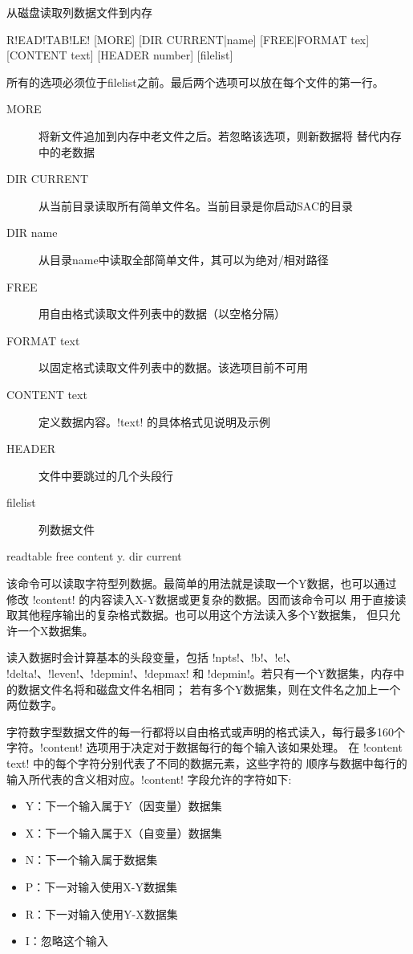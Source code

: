 \label{cmd:readtable}

从磁盘读取列数据文件到内存

\begin{SACSTX}
R!EAD!TAB!LE! [MORE] [DIR CURRENT|name] [FREE|FORMAT tex] [CONTENT text]
    [HEADER number] [filelist]
\end{SACSTX}
所有的选项必须位于filelist之前。最后两个选项可以放在每个文件的第一行。

\begin{description}
\item [MORE] 将新文件追加到内存中老文件之后。若忽略该选项，则新数据将
    替代内存中的老数据
\item [DIR CURRENT] 从当前目录读取所有简单文件名。当前目录是你启动SAC的目录
\item [DIR name] 从目录name中读取全部简单文件，其可以为绝对/相对路径
\item [FREE] 用自由格式读取文件列表中的数据（以空格分隔）
\item [FORMAT text] 以固定格式读取文件列表中的数据。该选项目前不可用
\item [CONTENT text] 定义数据内容。!text! 的具体格式见说明及示例
\item [HEADER] 文件中要跳过的几个头段行
\item [filelist] 列数据文件
\end{description}

\begin{SACDFT}
readtable free content y. dir current
\end{SACDFT}

该命令可以读取字符型列数据。最简单的用法就是读取一个Y数据，也可以通过
修改 !content! 的内容读入X-Y数据或更复杂的数据。因而该命令可以
用于直接读取其他程序输出的复杂格式数据。也可以用这个方法读入多个Y数据集，
但只允许一个X数据集。

读入数据时会计算基本的头段变量，包括 !npts!、!b!、!e!、
!delta!、!leven!、!depmin!、!depmax! 和
!depmin!。若只有一个Y数据集，内存中的数据文件名将和磁盘文件名相同；
若有多个Y数据集，则在文件名之加上一个两位数字。

字符数字型数据文件的每一行都将以自由格式或声明的格式读入，每行最多160个
字符。!content! 选项用于决定对于数据每行的每个输入该如果处理。
在 !content text! 中的每个字符分别代表了不同的数据元素，这些字符的
顺序与数据中每行的输入所代表的含义相对应。!content! 字段允许的字符如下:
\begin{itemize}
\item Y：下一个输入属于Y（因变量）数据集
\item X：下一个输入属于X（自变量）数据集
\item N：下一个输入属于数据集
\item P：下一对输入使用X-Y数据集
\item R：下一对输入使用Y-X数据集
\item I：忽略这个输入
\end{itemize}

